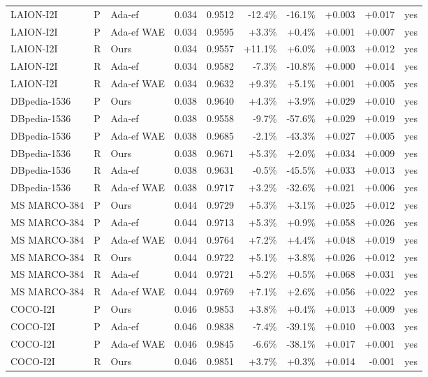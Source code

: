 \begin{tabular}{lllrrrrrrl}
LAION-I2I & P & Ada-ef & 0.034 & 0.9512 & -12.4\% & -16.1\% & +0.003 & +0.017 & yes \\
LAION-I2I & P & Ada-ef WAE & 0.034 & 0.9595 & +3.3\% & +0.4\% & +0.001 & +0.007 & yes \\
LAION-I2I & R & Ours & 0.034 & 0.9557 & +11.1\% & +6.0\% & +0.003 & +0.012 & yes \\
LAION-I2I & R & Ada-ef & 0.034 & 0.9582 & -7.3\% & -10.8\% & +0.000 & +0.014 & yes \\
LAION-I2I & R & Ada-ef WAE & 0.034 & 0.9632 & +9.3\% & +5.1\% & +0.001 & +0.005 & yes \\
DBpedia-1536 & P & Ours & 0.038 & 0.9640 & +4.3\% & +3.9\% & +0.029 & +0.010 & yes \\
DBpedia-1536 & P & Ada-ef & 0.038 & 0.9558 & -9.7\% & -57.6\% & +0.029 & +0.019 & yes \\
DBpedia-1536 & P & Ada-ef WAE & 0.038 & 0.9685 & -2.1\% & -43.3\% & +0.027 & +0.005 & yes \\
DBpedia-1536 & R & Ours & 0.038 & 0.9671 & +5.3\% & +2.0\% & +0.034 & +0.009 & yes \\
DBpedia-1536 & R & Ada-ef & 0.038 & 0.9631 & -0.5\% & -45.5\% & +0.033 & +0.013 & yes \\
DBpedia-1536 & R & Ada-ef WAE & 0.038 & 0.9717 & +3.2\% & -32.6\% & +0.021 & +0.006 & yes \\
MS MARCO-384 & P & Ours & 0.044 & 0.9729 & +5.3\% & +3.1\% & +0.025 & +0.012 & yes \\
MS MARCO-384 & P & Ada-ef & 0.044 & 0.9713 & +5.3\% & +0.9\% & +0.058 & +0.026 & yes \\
MS MARCO-384 & P & Ada-ef WAE & 0.044 & 0.9764 & +7.2\% & +4.4\% & +0.048 & +0.019 & yes \\
MS MARCO-384 & R & Ours & 0.044 & 0.9722 & +5.1\% & +3.8\% & +0.026 & +0.012 & yes \\
MS MARCO-384 & R & Ada-ef & 0.044 & 0.9721 & +5.2\% & +0.5\% & +0.068 & +0.031 & yes \\
MS MARCO-384 & R & Ada-ef WAE & 0.044 & 0.9769 & +7.1\% & +2.6\% & +0.056 & +0.022 & yes \\
COCO-I2I & P & Ours & 0.046 & 0.9853 & +3.8\% & +0.4\% & +0.013 & +0.009 & yes \\
COCO-I2I & P & Ada-ef & 0.046 & 0.9838 & -7.4\% & -39.1\% & +0.010 & +0.003 & yes \\
COCO-I2I & P & Ada-ef WAE & 0.046 & 0.9845 & -6.6\% & -38.1\% & +0.017 & +0.001 & yes \\
COCO-I2I & R & Ours & 0.046 & 0.9851 & +3.7\% & +0.3\% & +0.014 & -0.001 & yes \\

\end{tabular}
